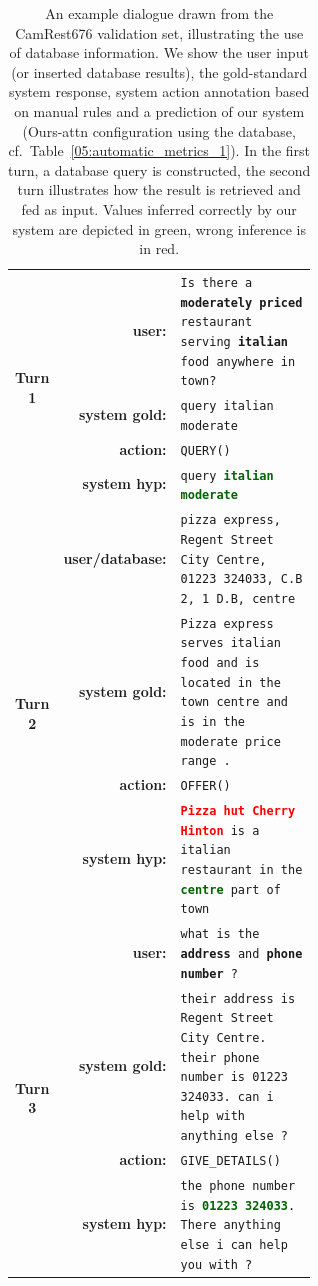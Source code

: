 \begin{table}[t]
    \centering\scriptsize
    \begin{tabular}{crp{0.6\linewidth}}
        \toprule
         \multirow{4}{*}{\bf Turn 1}&\bf user:& \texttt{Is there a \textbf{moderately priced} restaurant serving \textbf{italian} food anywhere in town?} \\
         &\bf system gold: & \texttt{query italian moderate} \\
         &\bf action: & \texttt{QUERY()} \\
         &\bf system hyp: & \texttt{query \textbf{\textcolor{darkgreen}{italian moderate}}}  \\
         \midrule
        \multirow{4}{*}{\bf Turn 2}&\bf user/database:& \texttt{pizza express, Regent Street City Centre, 01223 324033, C.B 2, 1 D.B, centre}  \\
         &\bf system gold:& \texttt{Pizza express serves italian food and is located in the town centre and is in the moderate price range .} \\        
        &\bf action: & \texttt{OFFER()} \\
        &\bf system hyp:& \texttt{\textbf{\textcolor{red}{Pizza hut Cherry Hinton}} is a italian restaurant in the \textbf{\textcolor{darkgreen}{centre}} part of town} \\
         \midrule
        \multirow{4}{*}{\bf Turn 3}&\bf user:& \texttt{what is the \textbf{address} and \textbf{phone number} ?} \\
        &\bf system gold:& \texttt{their address is  Regent Street City Centre. their phone number is 01223 324033. can i help with anything else ?} \\
         &\bf action: & \texttt{GIVE\_DETAILS()} \\
        & \bf system hyp:& \texttt{the phone number is \textbf{\textcolor{darkgreen}{01223 324033}}. There anything else i can help you with ?} \\
        \bottomrule
    \end{tabular}
    \vspace{-2mm}
    \caption{An example dialogue drawn from the CamRest676 validation set, illustrating the use of database information. We show the user input (or inserted database results), the gold-standard system response, system action annotation based on manual rules and a prediction of our system (Ours-attn configuration using the database, cf.~Table~\ref{05:automatic_metrics_1}). In the first turn, a database query is constructed, the second turn illustrates how the result is retrieved and fed as input. Values inferred correctly by our system are depicted in green, wrong inference is in red.}
    \label{05:tab:example}
\end{table}


